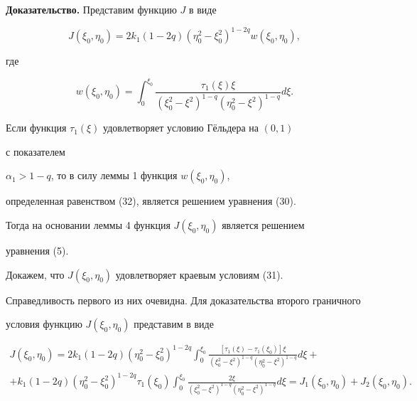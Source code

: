 {\bf Доказательство.} Представим функцию $J$ в виде


$$


J(\xi_0,\eta_0)=2k_1(1-2q)(\eta_0^2-\xi_0^2)^{1-2q} w(\xi_0,\eta_0),


$$


где 


\begin{equation}


w(\xi_0,\eta_0)=\int_0^{\xi_0} \frac{\tau_1 (\xi) \xi }


{(\xi_0^2-\xi^2)^{1-q} (\eta_0^2-\xi^2)^{1-q} }d\xi.


\end{equation}





Если функция $\tau_1(\xi)$ удовлетворяет условию Г\"ельдера на $(0,1)$ 


с показателем 


$\alpha_1>1-q$, то в силу леммы 1 функция $w(\xi_0,\eta_0)$, 


определенная равенством (32), является решением уравнения (30).


Тогда на основании леммы 4 функция $J(\xi_0,\eta_0)$ является решением 


уравнения (5).





Докажем, что $J(\xi_0,\eta_0)$ удовлетворяет краевым условиям (31).


Справедливость первого из них очевидна. Для доказательства второго граничного 


условия функцию $J(\xi_0,\eta_0)$ представим в виде


\begin{multline*}


J(\xi_0,\eta_0)=2k_1(1-2q)(\eta_0^2-\xi_0^2)^{1-2q} 


\int_0^{\xi_0} \frac{\left[\tau_1 (\xi)-\tau_1(\xi_0)\right] \xi}


{(\xi_0^2-\xi^2)^{1-q} (\eta_0^2-\xi^2)^{1-q} }d\xi + \\


%


+k_1(1-2q)(\eta_0^2-\xi_0^2)^{1-2q} \tau_1(\xi_0)


\int_0^{\xi_0} \frac{2\xi}


{(\xi_0^2-\xi^2)^{1-q} (\eta_0^2-\xi^2)^{1-q} }d\xi =


J_1(\xi_0,\eta_0)+J_2(\xi_0,\eta_0).


\end{multline*}


